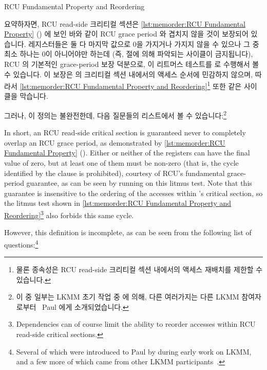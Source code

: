 \begin{listing}[tbp]

\caption{RCU Fundamental Property and Reordering}
\label{lst:memorder:RCU Fundamental Property and Reordering}
\end{listing}

요약하자면, RCU read-side 크리티컬 섹션은
\cref{lst:memorder:RCU Fundamental Property}
() 에 보인 바와 같이 RCU grace period
와 겹치지 않을 것이 보장되어 있습니다.
 레지스터들은 둘 다 마지막 값으로 0을 가지거나 가지지 않을 수 있으나 그
중 최소 하나는 0이 아니어야만 하는데 (즉,  절에 의해 파악되는
사이클이 금지됩니다), RCU 의 기본적인 grace-period 보장 덕분으로, 이 리트머스
테스트를  로 수행해서 볼 수 있습니다.
이 보장은  의 크리티컬 섹션 내에서의 액세스 순서에 민감하지 않으며,
따라서
\cref{lst:memorder:RCU Fundamental Property and Reordering}\footnote{
	물론 종속성은 RCU read-side 크리티컬 섹션 내에서의 액세스 재배치를
	제한할 수 있습니다.}
또한 같은 사이클을 막습니다.

그러나, 이 정의는 불완전한데, 다음 질문들의 리스트에서 볼 수
있습니다:\footnote{
	이 중 일부는 LKMM 초기 작업 중  에 의해, 다른
	여러가지는 다른 LKMM
	참여자로부터~\cite{Alglave:2018:FSC:3173162.3177156} Paul 에게
	소개되었습니다.}

\iffalse

In short, an RCU read-side critical section is guaranteed never to
completely overlap an RCU grace period, as demonstrated by
\cref{lst:memorder:RCU Fundamental Property}
().
Either or neither of the  registers can have the final value of zero,
but at least one of them must be non-zero (that is, the cycle identified
by the  clause is prohibited), courtesy of RCU's fundamental
grace-period guarantee, as can be seen by running  on this litmus test.
Note that this guarantee is insensitive to the ordering of the accesses
within 's critical section, so the litmus test shown in
\cref{lst:memorder:RCU Fundamental Property and Reordering}\footnote{
	Dependencies can of course limit the ability to reorder accesses
	within RCU read-side critical sections.}
also forbids this same cycle.

However, this definition is incomplete, as can be seen from the following
list of questions:\footnote{
	Several of which were introduced to Paul by  during
	early work on LKMM, and a few more of which came from other
	LKMM participants~\cite{Alglave:2018:FSC:3173162.3177156}.}

